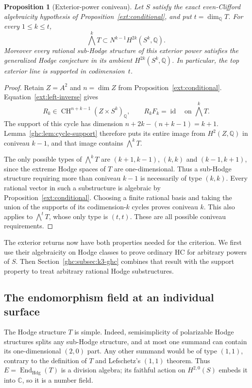 \documentclass[11pt]{amsart}
\newcommand{\Q}{\mathbb Q}
\newcommand{\C}{\mathbb C}
\DeclareMathOperator{\CH}{CH}
\DeclareMathOperator{\End}{End}
\DeclareMathOperator{\id}{id}
\newtheorem{proposition}[theorem]{Proposition}
\theoremstyle{definition}
\theoremstyle{remark}
\numberwithin{equation}{section}
\begin{document}
\begin{proposition}[Exterior-power coniveau]
\label{ghc:prop:exterior-coniveau}
Let $S$ satisfy the exact even-Clifford algebraicity hypothesis of
Proposition~\ref{ext:conditional}, and put $t=\dim_\Q T$.
For every $1\le k\le t$,
\[
 \bigwedge^kT\subset N^{k-1}H^{2k}(S^k,\Q).
\]
Moreover every rational sub-Hodge structure of this exterior power
satisfies the generalized Hodge conjecture in its ambient
$H^{2k}(S^k,\Q)$.  In particular, the top exterior line is supported
in codimension~$t$.
\end{proposition}
\begin{proof}
Retain $Z=A^2$ and $n=\dim Z$ from
Proposition~\ref{ext:conditional}.  Equation~\eqref{ext:left-inverse}
gives
\[
 R_k\in\CH^{n+k-1}(Z\times S^k)_\Q,
 \qquad R_kF_k=\id\quad\text{on }\bigwedge^kT.
\]
The support of this cycle has dimension
$n+2k-(n+k-1)=k+1$.  Lemma~\ref{ghc:lem:cycle-support} therefore
puts its entire image from $H^2(Z,\Q)$ in coniveau $k-1$,
and that image contains $\bigwedge^kT$.

The only possible types of $\bigwedge^kT$ are
$(k+1,k-1)$, $(k,k)$ and $(k-1,k+1)$, since the extreme Hodge
spaces of $T$ are one-dimensional.  Thus a sub-Hodge structure
requiring more than coniveau $k-1$ is necessarily of type $(k,k)$.
Every rational vector in such a substructure is algebraic by
Proposition~\ref{ext:conditional}.  Choosing a finite rational basis
and taking the union of the supports of its codimension-$k$ cycles
proves coniveau $k$.  This also applies to $\bigwedge^tT$, whose
only type is $(t,t)$.  These are all possible coniveau requirements.
\end{proof}

The exterior returns now have both properties needed for the
criterion.  We first use their algebraicity on Hodge classes to
prove ordinary HC for arbitrary powers of $S$.  Then
Section~\ref{ghc:subsec:k3-ghc} combines that result with the support
property to treat arbitrary rational Hodge substructures.

\subsection{The endomorphism field at an individual surface}

The Hodge structure $T$ is simple.  Indeed, semisimplicity of
polarizable Hodge structures splits any sub-Hodge structure, and
at most one summand can contain its one-dimensional $(2,0)$ part.
Any other summand would be of type $(1,1)$, contrary to the
definition of $T$ and Lefschetz's $(1,1)$ theorem.  Thus
$E=\End_{\mathrm{Hdg}}(T)$ is a division algebra; its faithful action
on $H^{2,0}(S)$ embeds it into $\C$, so it is a number field.
\end{document}
